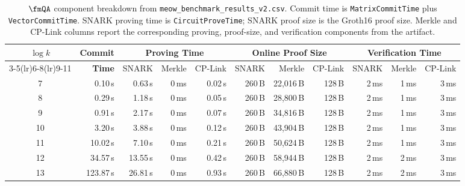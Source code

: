 \begin{table}[t]
\centering
\scriptsize
\setlength{\tabcolsep}{3.5pt}
\begin{tabular}{c r rrr rrr rrr}
\toprule
\multirow{2}{*}{$\log k$}
  & \multirow{2}{*}{\textbf{Commit}}
  & \multicolumn{3}{c}{\textbf{Proving Time}}
  & \multicolumn{3}{c}{\textbf{Online Proof Size}}
  & \multicolumn{3}{c}{\textbf{Verification Time}} \\
\cmidrule(lr){3-5}\cmidrule(lr){6-8}\cmidrule(lr){9-11}
  & \textbf{Time}
  & SNARK & Merkle & CP-Link
  & SNARK & Merkle & CP-Link
  & SNARK & Merkle & CP-Link \\
\midrule
7  & 0.10\,s  & 0.63\,s  & 0\,ms & 0.02\,s & 260\,B & 22{,}016\,B & 128\,B & 2\,ms & 1\,ms & 3\,ms \\
8  & 0.29\,s  & 1.18\,s  & 0\,ms & 0.05\,s & 260\,B & 28{,}800\,B & 128\,B & 2\,ms & 1\,ms & 3\,ms \\
9  & 0.91\,s  & 2.17\,s  & 0\,ms & 0.07\,s & 260\,B & 34{,}816\,B & 128\,B & 2\,ms & 1\,ms & 3\,ms \\
10 & 3.20\,s  & 3.88\,s  & 0\,ms & 0.12\,s & 260\,B & 43{,}904\,B & 128\,B & 2\,ms & 1\,ms & 3\,ms \\
11 & 10.02\,s & 7.10\,s  & 0\,ms & 0.21\,s & 260\,B & 50{,}624\,B & 128\,B & 2\,ms & 1\,ms & 3\,ms \\
12 & 34.57\,s & 13.55\,s & 0\,ms & 0.42\,s & 260\,B & 58{,}944\,B & 128\,B & 2\,ms & 2\,ms & 3\,ms \\
13 & 123.87\,s & 26.81\,s & 0\,ms & 0.93\,s & 260\,B & 66{,}880\,B & 128\,B & 2\,ms & 2\,ms & 3\,ms \\
\bottomrule
\end{tabular}
\caption{$\fmQA$ component breakdown from
\texttt{meow\_benchmark\_results\_v2.csv}. Commit time is
\texttt{MatrixCommitTime} plus \texttt{VectorCommitTime}. SNARK proving time is
\texttt{CircuitProveTime}; SNARK proof size is the Groth16 proof size. Merkle
and CP-Link columns report the corresponding proving, proof-size, and
verification components from the artifact.}
\label{tab:meow-breakdown}
\end{table}
